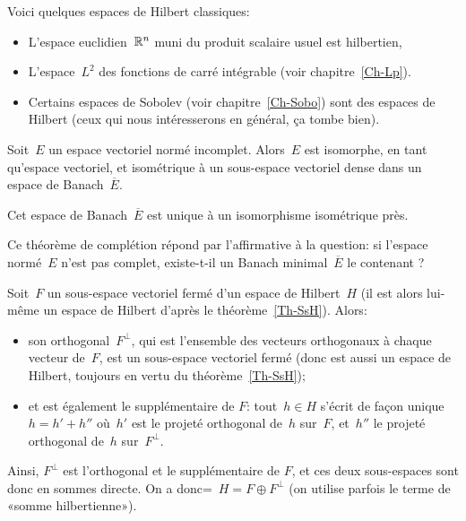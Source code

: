 \medskip
Voici quelques espaces de Hilbert classiques:
\begin{itemize}
  \item L'espace euclidien~$\mathbb R^n$ muni du produit scalaire usuel est hilbertien, 
  \item L'espace~$L^2$ des fonctions de carré intégrable (voir chapitre~\ref{Ch-Lp}).
  \item Certains espaces de Sobolev (voir chapitre~\ref{Ch-Sobo}) sont des espaces de Hilbert (ceux qui nous intéresserons en général, ça tombe bien).
\end{itemize}

\medskip
\begin{theoreme}\label{th:complbanach}
Soit~$E$ un espace vectoriel normé incomplet.
Alors~$E$ est isomorphe, en tant qu'espace vectoriel, et isométrique à un sous-espace vectoriel dense dans un espace de Banach~$\overline{E}$.

Cet espace de Banach~$\overline{E}$ est unique à un isomorphisme isométrique près.
\end{theoreme}

Ce théorème de complétion répond par l'affirmative à la question: si l'espace normé~$E$ n'est pas complet, existe-t-il un Banach minimal~$\overline{E}$ le
contenant ?

\medskip
\begin{theoreme}\label{th:projHilbert}
Soit~$F$ un sous-espace vectoriel fermé d'un espace de Hilbert~$H$ (il est alors lui-même un espace de Hilbert d'après le théorème~\ref{Th-SsH}). Alors:
\begin{itemize}
  \item son orthogonal~$F^\bot$, qui est l'ensemble des vecteurs orthogonaux à chaque 	vecteur de~$F$, est un sous-espace vectoriel fermé (donc est aussi un espace de Hilbert, toujours en vertu du théorème~\ref{Th-SsH});
  \item et est également le supplémentaire de $F$: tout~$h\in H$ s'écrit de façon unique~$h=h'+h''$ où~$h'$ est le projeté orthogonal de~$h$ sur~$F$, et~$h''$ le projeté orthogonal de~$h$ sur~$F^\bot$.
\end{itemize}

\medskip
Ainsi, $F^\bot$ est l'orthogonal et le supplémentaire de $F$, et ces deux sous-espaces sont donc en sommes directe. On a donc=~$H=F\oplus F^\bot$ (on utilise parfois le terme de «somme hilbertienne»).
\end{theoreme}

